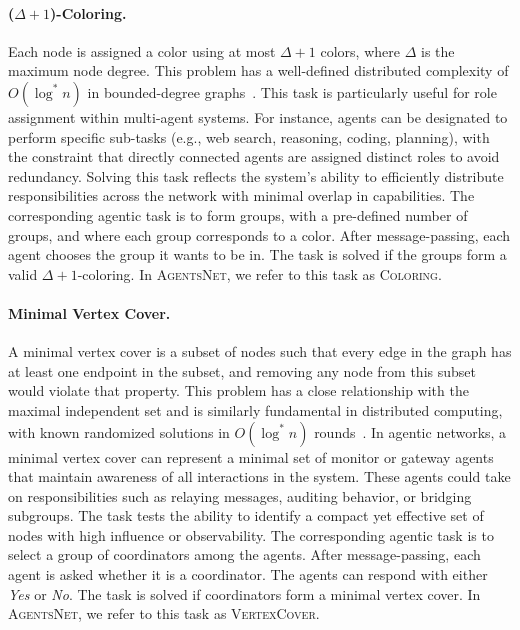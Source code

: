 \documentclass{article}
\newcommand{\benchmark}{\textsc{AgentsNet}}
\begin{document}
\paragraph{($\Delta + 1$)-Coloring.} Each node is assigned a color using at most $\Delta + 1$ colors, where $\Delta$ is the maximum node degree. This problem has a well-defined distributed complexity of $O(\log^* n)$ in bounded-degree graphs~\citep{barenboim2016deterministic}.
This task is particularly useful for role assignment within multi-agent systems. For instance, agents can be designated to perform specific sub-tasks (e.g., web search, reasoning, coding, planning), with the constraint that directly connected agents are assigned distinct roles to avoid redundancy. Solving this task reflects the system's ability to efficiently distribute responsibilities across the network with minimal overlap in capabilities. The corresponding agentic task is to form groups, with a pre-defined number of groups, and where each group corresponds to a color. After message-passing, each agent chooses the group it wants to be in. The task is solved if the groups form a valid $\Delta + 1$-coloring. In \benchmark{}, we refer to this task as \textsc{Coloring}.

\paragraph{Minimal Vertex Cover.} A minimal vertex cover is a subset of nodes such that every edge in the graph has at least one endpoint in the subset, and removing any node from this subset would violate that property. This problem has a close relationship with the maximal independent set and is similarly fundamental in distributed computing, with known randomized solutions in $O(\log^* n)$ rounds~\cite{linial1992local}.
In agentic networks, a minimal vertex cover can represent a minimal set of monitor or gateway agents that maintain awareness of all interactions in the system. These agents could take on responsibilities such as relaying messages, auditing behavior, or bridging subgroups. The task tests the ability to identify a compact yet effective set of nodes with high influence or observability. The corresponding agentic task is to select a group of coordinators among the agents. After message-passing, each agent is asked whether it is a coordinator. The agents can respond with either \textit{Yes} or \textit{No}. The task is solved if coordinators form a minimal vertex cover. In \benchmark{}, we refer to this task as \textsc{VertexCover}.
\end{document}
